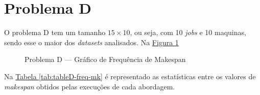 \section{Problema D}
O problema D tem um tamanho $15 \times 10$, ou seja, com 10 \textit{jobs} e 10 maquinas, 
sendo esse o maior dos \textit{datasets} analisados.
Na \hyperref[fig:plobD-freq-mk]{Figura \ref{fig:plobD-freq-mk}} 
\begin{figure}[!htb]
    \caption{Problema D — Gráfico de Frequência de Makespan}
    \label{fig:plobD-freq-mk}
    \begin{minipage}{.5\linewidth}
        \centering
        \subfloat[]{
            \label{plobD-freq-mk:a}
            \resizebox{\linewidth}{!}{}
        }
    \end{minipage}%
    \begin{minipage}{.5\linewidth}
        \centering
        \subfloat[]{
            \label{plobD-freq-mk:b}
            \resizebox{\linewidth}{!}{}
        }
    \end{minipage}\par\medskip
      \centering
      \subfloat[]{
        \label{plobD-freq-mk:c}
        \resizebox{.5\linewidth}{!}{}
      }
\end{figure}
Na
\hyperref[tab:tableD-freq-mk]{Tabela \ref{tab:tableD-freq-mk}}
é representado as estatísticas entre os valores de \textit{makespan} obtidos pelas execuções de cada abordagem.
